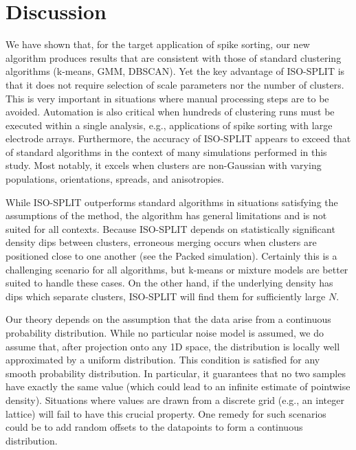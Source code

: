 \documentclass[10pt]{article}
\begin{document}
\section {Discussion}

We have shown that, for the target application of spike sorting, our new algorithm produces results that are consistent with those of standard clustering algorithms (k-means, GMM, DBSCAN). Yet the key advantage of ISO-SPLIT is that it does not require selection of scale parameters nor the number of clusters. This is very important in situations where manual processing steps are to be avoided.
Automation is also critical when hundreds of clustering runs must be executed within a single analysis, e.g., applications of spike sorting with large electrode arrays. Furthermore, the accuracy of ISO-SPLIT appears to exceed that of standard algorithms in the context of many simulations performed in this study. Most notably, it excels when clusters are non-Gaussian with varying populations, orientations, spreads, and anisotropies.

While ISO-SPLIT outperforms standard algorithms in situations satisfying the assumptions of the method, the algorithm has general limitations and is not suited for all contexts. Because ISO-SPLIT depends on statistically significant density dips between clusters, erroneous merging occurs when clusters are positioned close to one another (see the Packed simulation). Certainly this is a challenging scenario for all algorithms, but k-means or mixture models are better suited to handle these cases. On the other hand,
if the underlying density has dips which separate clusters, ISO-SPLIT will
find them for sufficiently large $N$.

Our theory depends on the assumption that the data arise from a continuous probability distribution. While no particular noise model is assumed, we do assume that, after projection onto any 1D space, the distribution is locally well approximated by a uniform distribution. This condition is satisfied for any smooth probability distribution. In particular, it guarantees that no two samples have exactly the same value (which could lead to an infinite estimate of pointwise density). Situations where values are drawn from a discrete grid (e.g., an integer lattice) will fail to have this crucial property. One remedy for such scenarios could be to add random offsets to the datapoints to form a continuous distribution.
\end{document}
